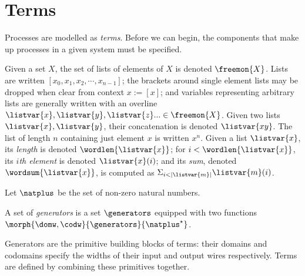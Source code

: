 \section{Terms}

Processes are modelled as \emph{terms}.
Before we can begin, the components that make up processes in a given system
must be specified.

\begin{notation}[Lists]
    Given a set \(X\), the set of lists of elements of \(X\) is denoted
    \(\freemon{X}\).
    Lists are written \([x_0, x_1, x_2, \cdots, x_{n-1}]\); the brackets around
    single element lists may be dropped when clear from context \(x := [x]\);
    and variables representing arbitrary lists are generally written with an
    overline \(
        \listvar{x}, \listvar{y}, \listvar{z}... \in \freemon{X}
    \).
    Given two lists \(\listvar{x}, \listvar{y}\), their concatenation is
    denoted \(\listvar{xy}\).
    The list of length \(n\) containing just element \(x\) is written \(x^n\).
    Given a list \(\listvar{x}\), its \emph{length} is denoted
    \(\wordlen{\listvar{x}}\); for \(i < \wordlen{\listvar{x}}\), its
    \(i\)\emph{th element} is denoted \(\listvar{x}(i)\); and its
    \emph{sum}, denoted \(\wordsum{\listvar{x}}\), is computed as
    \(\Sigma_{i < |\listvar{m}|}\listvar{m}(i)\).
\end{notation}

\begin{notation}
    Let \(\natplus\) be the set of non-zero natural numbers.
\end{notation}

\begin{definition}[Generators]
    A set of \emph{generators} is a set \(\generators\) equipped with two
    functions \(\morph{\domw,\codw}{\generators}{\natplus^\star}\).
\end{definition}

Generators are the primitive building blocks of terms: their domains and
codomains specify the widths of their input and output wires respectively.
Terms are defined by combining these primitives together.

